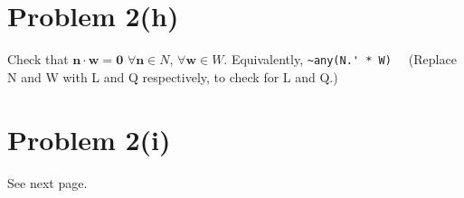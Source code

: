 \documentclass{article}
\begin{document}

\section*{Problem 2(h)}


Check that $\mathbf{n} \cdot \mathbf{w} = \mathbf{0}$ $ \forall \mathbf{n} \in N$, $ \forall \mathbf{w} \in W$. Equivalently, \verb#~any(N.' * W)  # (Replace N and W with L and Q respectively, to check for L and Q.)

\section*{Problem 2(i)}

See next page.

\end{document}
